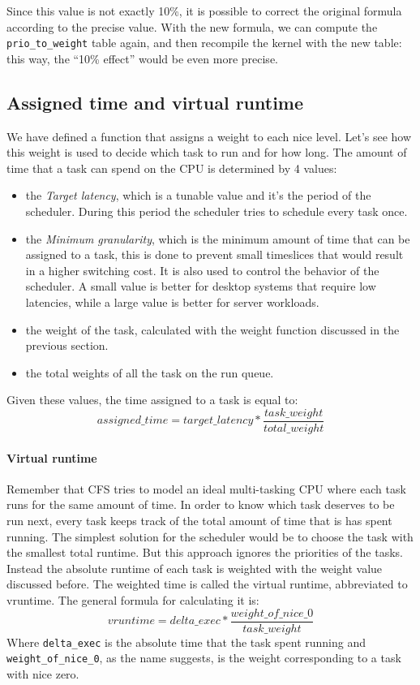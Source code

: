 Since this value is not exactly 10\%, it is possible to correct the original formula according to the precise value. With the new formula, we can compute the \verb|prio_to_weight| table again, and then recompile the kernel with the new table: this way, the ``10\% effect'' would be even more precise.

\subsection{Assigned time and virtual runtime}
We have defined a function that assigns a weight to each nice level. Let's see how this weight is used to decide which task to run and for how long. The amount of time that a task can spend on the CPU is determined by 4 values:
\begin{itemize}
    \item the \textit{Target latency}, which is a tunable value and it's the period of the scheduler. During this period the scheduler tries to schedule every task once. 
    \item the \textit{Minimum granularity}, which is the minimum amount of time that can be assigned to a task, this is done to prevent small timeslices that would result in a higher switching cost. It is also used to control the behavior of the scheduler. A small value is better for desktop systems that require low latencies, while a large value is better for server workloads.
    \item the weight of the task, calculated with the weight function discussed in the previous section.
    \item the total weights of all the task on the run queue.
\end{itemize}
Given these values, the time assigned to a task is equal to: 
\begin{equation} \label{eq:2.4}
    assigned\_time = target\_latency * \frac{task\_weight}{total\_weight}
\end{equation}

\paragraph{Virtual runtime}
Remember that CFS tries to model an ideal multi-tasking CPU where each task runs for the same amount of time. In order to know which task deserves to be run next, every task keeps track of the total amount of time that is has spent running. The simplest solution for the scheduler would be to choose the task with the smallest total runtime. But this approach ignores the priorities of the tasks. Instead the absolute runtime of each task is weighted with the weight value discussed before. The weighted time is called the virtual runtime, abbreviated to vruntime. The general formula for calculating it is:
\begin{equation}
    vruntime = delta\_exec * \frac{weight\_of\_nice\_0}{task\_weight}
\end{equation}
Where \verb|delta_exec| is the absolute time that the task spent running and \verb|weight_of_nice_0|, as the name suggests, is the weight corresponding to a task with nice zero.

